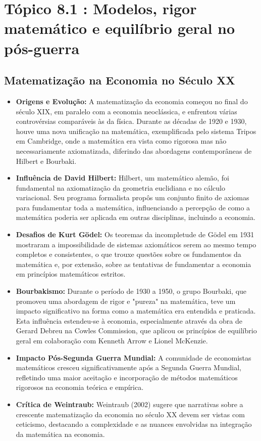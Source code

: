 \documentclass[a4paper,12pt]{article}[abntex2]
\begin{document}
\newpage
\section{\textbf{Tópico 8.1 : Modelos, rigor matemático e equilíbrio geral no pós-guerra}}
\subsection{Matematização na Economia no Século XX}
\begin{itemize}
  \item \textbf{Origens e Evolução:} A matematização da economia começou no final do século XIX, em paralelo com a economia neoclássica, e enfrentou várias controvérsias comparáveis às da física. Durante as décadas de 1920 e 1930, houve uma nova unificação na matemática, exemplificada pelo sistema Tripos em Cambridge, onde a matemática era vista como rigorosa mas não necessariamente axiomatizada, diferindo das abordagens contemporâneas de Hilbert e Bourbaki.

  \item \textbf{Influência de David Hilbert:} Hilbert, um matemático alemão, foi fundamental na axiomatização da geometria euclidiana e no cálculo variacional. Seu programa formalista propôs um conjunto finito de axiomas para fundamentar toda a matemática, influenciando a percepção de como a matemática poderia ser aplicada em outras disciplinas, incluindo a economia.

  \item \textbf{Desafios de Kurt Gödel:} Os teoremas da incompletude de Gödel em 1931 mostraram a impossibilidade de sistemas axiomáticos serem ao mesmo tempo completos e consistentes, o que trouxe questões sobre os fundamentos da matemática e, por extensão, sobre as tentativas de fundamentar a economia em princípios matemáticos estritos.

  \item \textbf{Bourbakismo:} Durante o período de 1930 a 1950, o grupo Bourbaki, que promoveu uma abordagem de rigor e "pureza" na matemática, teve um impacto significativo na forma como a matemática era entendida e praticada. Esta influência estendeu-se à economia, especialmente através da obra de Gerard Debreu na Cowles Commission, que aplicou os princípios de equilíbrio geral em colaboração com Kenneth Arrow e Lionel McKenzie.

  \item \textbf{Impacto Pós-Segunda Guerra Mundial:} A comunidade de economistas matemáticos cresceu significativamente após a Segunda Guerra Mundial, refletindo uma maior aceitação e incorporação de métodos matemáticos rigorosos na economia teórica e empírica.

  \item \textbf{Crítica de Weintraub:} Weintraub (2002) sugere que narrativas sobre a crescente matematização da economia no século XX devem ser vistas com ceticismo, destacando a complexidade e as nuances envolvidas na integração da matemática na economia.
\end{itemize}
\end{document}
